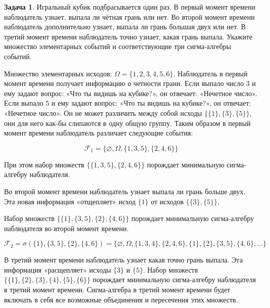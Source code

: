 \documentclass[pdftex, 12pt, a4paper]{article}
\def\F{\ensuremath{\mathcal{F}}} %
\def\s{\ensuremath{\sigma}}
\def \Om{\Omega}
\theoremstyle{definition} %
\newtheorem{problem}{Задача}
\numberwithin{problem}{section}
\numberwithin{blits}{section}
\begin{document}
\begin{problem}
Игральный кубик подбрасывается один раз. В первый момент времени наблюдатель узнает, выпала ли чётная грань или нет. Во второй момент времени наблюдатель дополнительно узнает, выпала ли грань большая двух или нет. В третий момент времени наблюдатель точно узнает, какая грань выпала. Укажите множество элементарных событий и соответствующие три сигма-алгебры событий.
\begin{sol}
Множество элементарных исходов: $\Om = \{1,2,3,4,5,6\}$. Наблюдатель в первый момент времени получает информацию о четности грани. Если выпало число $3$ и ему задают вопрос: «Что ты видишь на кубике?», он отвечает: «Нечетное число». Если выпало $5$ и ему задают вопрос: «Что ты видишь на кубике?», он отвечает: «Нечетное число». Он не может различить между собой исходы $\{\{1\},\{3\},\{5\}\}$, они для него как-бы слипаются в одну общую группу. Таким образом в первый момент времени наблюдатель различает следующие события:

\[\F_1 = \{\varnothing, \Om, \{1,3,5\},\{2,4,6\} \} \]

При этом набор множеств $\{\{1,3,5\},\{2,4,6\}\}$ порождает минимальную сигма-алгебру наблюдателя.

Во второй момент времени наблюдатель узнает выпала ли грань больше двух. Эта новая информация «отщепляет» исход $\{1\}$ от исходов $\{\{3\},\{5\}\}$. 

Набор множеств $\{\{1\},\{3,5\},\{2\},\{4,6\}\}$ порождает минимальную сигма-алгебру наблюдателя во второй момент времени.

\[\F_2 = \s(\{1\},\{3,5\},\{2\},\{4,6\}) = \{\varnothing, \Om, \{1,3,4\},\{2,4,6\},\{1\},\{2\},\{3,5\},\{4,6\}, \dots \}\] 

В третий момент времени наблюдатель узнает какая точно грань выпала. Эта информация «расщепляет» исходы  $\{3\}$ и $\{5\}$. Набор множеств  $\{\{1\},\{2\},\{3\},\{4\},\{5\},\{6\}\}$ порождает минимальную сигма-алгебру наблюдателя в третий момент времени. Сигма-алгебра в третий момент времени будет включать в себя все возможные объединения и пересечения этих множеств. 
\end{sol}
\end{problem}
\end{document}
